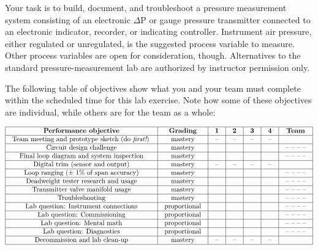 \begin{itemize}
\vskip 5pt

Your task is to build, document, and troubleshoot a pressure measurement system consisting of an electronic $\Delta$P or gauge pressure transmitter connected to an electronic indicator, recorder, or indicating controller.  Instrument air pressure, either regulated or unregulated, is the suggested process variable to measure.  Other process variables are open for consideration, though.  Alternatives to the standard pressure-measurement lab are authorized by instructor permission only.

The following table of objectives show what you and your team must complete within the scheduled time for this lab exercise.  Note how some of these objectives are individual, while others are for the team as a whole:



$$\vbox{\offinterlineskip
\halign{\strut
\vrule \quad\hfil # \ \hfil & 
\vrule \quad\hfil # \ \hfil & 
\vrule \quad\hfil # \ \hfil & 
\vrule \quad\hfil # \ \hfil & 
\vrule \quad\hfil # \ \hfil & 
\vrule \quad\hfil # \ \hfil & 
\vrule \quad\hfil # \ \hfil \vrule \cr
\noalign{\hrule}
%
{\bf Performance objective} & {\bf Grading} & {\bf 1} & {\bf 2} & {\bf 3} & {\bf 4} & {\bf Team} \cr
%
\noalign{\hrule}
%
Team meeting and prototype sketch (do {\it first!}) & mastery & -- & -- & -- & -- & \cr
%
\noalign{\hrule}
%
Circuit design challenge & mastery & & & & & -- -- -- -- \cr
%
\noalign{\hrule}
%
Final loop diagram and system inspection & mastery & & & & & -- -- -- -- \cr
%
\noalign{\hrule}
%
Digital trim (sensor and output) & mastery & -- & -- & -- & -- &  \cr
%
\noalign{\hrule}
%
Loop ranging ($\pm$ 1\% of span accuracy) & mastery & & & & & -- -- -- -- \cr
%
\noalign{\hrule}
%
Deadweight tester research and usage & mastery & & & & & -- -- -- -- \cr
%
\noalign{\hrule}
%
Transmitter valve manifold usage & mastery & & & & & -- -- -- -- \cr
%
\noalign{\hrule}
%
Troubleshooting & mastery & & & & & -- -- -- -- \cr
%
\noalign{\hrule}
%
Lab question: Instrument connections & proportional &  &  &  &  & -- -- -- -- \cr
%
\noalign{\hrule}
%
Lab question: Commissioning & proportional &  &  &  &  & -- -- -- -- \cr
%
\noalign{\hrule}
%
Lab question: Mental math & proportional &  &  &  &  & -- -- -- -- \cr
%
\noalign{\hrule}
%
Lab question: Diagnostics & proportional &  &  &  &  & -- -- -- -- \cr
%
\noalign{\hrule}
%
Decommission and lab clean-up & mastery & -- & -- & -- & -- &  \cr
%
\noalign{\hrule}
} %
}$$ %


\end{itemize}
